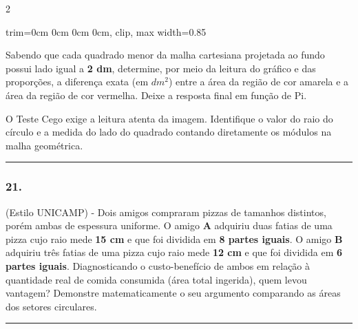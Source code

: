 \documentclass[twoside, 10pt, a4paper]{article}
\newlength{\espacoPreQuestao}\setlength{\espacoPreQuestao}{0.1cm}
\newlength{\espacoQuestao}\setlength{\espacoQuestao}{0.2cm}
\newcommand{\larguraTikz}{0.85\linewidth}
\begin{document}
\begin{multicols*}{2}
\begin{center}
\begin{adjustbox}{trim=0cm 0cm 0cm 0cm, clip, max width=\larguraTikz}
\end{adjustbox}
\end{center}
Sabendo que cada quadrado menor da malha cartesiana projetada ao fundo possui lado igual a \textbf{2 dm}, determine, por meio da leitura do gráfico e das proporções, a diferença exata (em $dm^2$) entre a área da região de cor amarela e a área da região de cor vermelha. Deixe a resposta final em função de Pi.
\par\vspace{\espacoQuestao}

\begin{boxdica}
O Teste Cego exige a leitura atenta da imagem. Identifique o valor do raio do círculo e a medida do lado do quadrado contando diretamente os módulos na malha geométrica.
\end{boxdica}

\noindent\textcolor{CorLinha}{\rule{\linewidth}{0.5pt}} 
\par\vspace{\espacoPreQuestao}
\subsubsection*{21.} (Estilo UNICAMP) - Dois amigos compraram pizzas de tamanhos distintos, porém ambas de espessura uniforme. O amigo \textbf{A} adquiriu duas fatias de uma pizza cujo raio mede \textbf{15 cm} e que foi dividida em \textbf{8 partes iguais}. O amigo \textbf{B} adquiriu três fatias de uma pizza cujo raio mede \textbf{12 cm} e que foi dividida em \textbf{6 partes iguais}. Diagnosticando o custo-benefício de ambos em relação à quantidade real de comida consumida (área total ingerida), quem levou vantagem? Demonstre matematicamente o seu argumento comparando as áreas dos setores circulares.
\par\vspace{\espacoQuestao}

\noindent\textcolor{CorLinha}{\rule{\linewidth}{0.5pt}} 
\par\vspace{\espacoPreQuestao}

\end{multicols*}
\end{document}
